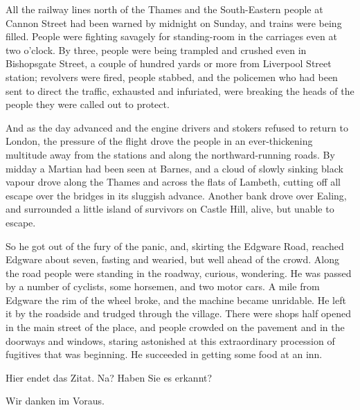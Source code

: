 \documentclass[11pt,ngerman,latin9,a4paper]{g-brief-ntz39lg22_exp}
\begin{document}
\begin{g-brief}
All the railway lines north of the Thames and the South-Eastern people at Cannon Street had been warned by midnight on Sunday, and trains were being filled.  People were fighting savagely for standing-room in the carriages even at two o'clock.  By three, people were being trampled and crushed even in Bishopsgate Street, a couple of hundred yards or more from Liverpool Street station; revolvers were fired, people stabbed, and the policemen who had been sent to direct the traffic, exhausted and infuriated, were breaking the heads of the people they were called out to protect.

And as the day advanced and the engine drivers and stokers refused to return to London, the pressure of the flight drove the people in an ever-thickening multitude away from the stations and along the northward-running roads.  By midday a Martian had been seen at Barnes, and a cloud of slowly sinking black vapour drove along the Thames and across the flats of Lambeth, cutting off all escape over the bridges in its sluggish advance.  Another bank drove over Ealing, and surrounded a little island of survivors on Castle Hill, alive, but unable to escape.

So he got out of the fury of the panic, and, skirting the Edgware Road, reached Edgware about seven, fasting and wearied, but well ahead of the crowd.  Along the road people were standing in the roadway, curious, wondering.  He was passed by a number of cyclists, some horsemen, and two motor cars.  A mile from Edgware the rim of the wheel broke, and the machine became unridable.  He left it by the roadside and trudged through the village.  There were shops half opened in the main street of the place, and people crowded on the pavement and in the doorways and windows, staring astonished at this extraordinary procession of fugitives that was beginning.  He succeeded in getting some food at an inn.

Hier endet das Zitat. Na? Haben Sie es erkannt?

Wir danken im Voraus.

\end{g-brief}
\end{document}
